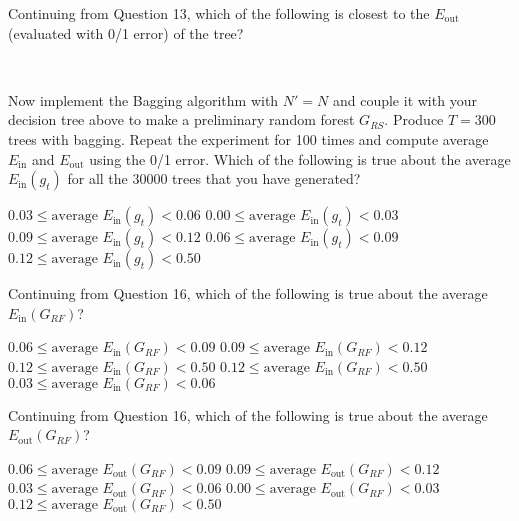 \documentclass[a4paper,10pt]{exam}
\begin{document}
\begin{questions}
	    \question Continuing from Question 13, which of the following is closest to the $E_{\text{out}}$ (evaluated with 0/1 error) of the tree?
	    \begin{choices}
	    \\
	    \end{choices}
	    
	    \question Now implement the Bagging algorithm with $N' = N$ and couple it with your decision tree above to make a preliminary random forest $G_{RS}$. Produce $T=300$ trees with bagging. Repeat the experiment for 100 times and compute average $E_{\text{in}}$ and $E_{\text{out}}$ using the 0/1 error.
	    Which of the following is true about the average $E_{\text{in}}(g_t)$ for all the 30000 trees that you have generated?
	    \begin{choices}
	    	\CorrectChoice $0.03 \leq \mbox{average } E_{\text{in}}(g_t) <0.06$
	    	\choice $0.00 \leq \mbox{average } E_{\text{in}}(g_t) < 0.03$
	    	\choice $0.09 \leq \mbox{average } E_{\text{in}}(g_t) < 0.12$
	    	\choice $0.06 \leq \mbox{average } E_{\text{in}}(g_t) < 0.09$
	    	\choice $0.12 \leq \mbox{average } E_{\text{in}}(g_t) < 0.50$\\
	    \end{choices}
	    
	    \question Continuing from Question 16, which of the following is true about the average $E_{\text{in}}(G_{RF})$?
	    \begin{choices}
	    	\choice $0.06 \leq \mbox{average } E_{\text{in}}(G_{RF}) < 0.09$
	    	\choice $0.09 \leq \mbox{average } E_{\text{in}}(G_{RF}) < 0.12$
	    	\choice $0.12 \leq \mbox{average } E_{\text{in}}(G_{RF}) < 0.50$
	    	\CorrectChoice $0.12 \leq \mbox{average } E_{\text{in}}(G_{RF}) < 0.50$
	    	\choice $0.03 \leq \mbox{average } E_{\text{in}}(G_{RF}) < 0.06$\\
	    \end{choices}
	    
	    \question Continuing from Question 16, which of the following is true about the average $E_{\text{out}}(G_{RF})$?
	    \begin{choices}
	    	\CorrectChoice $0.06 \leq \mbox{average } E_{\text{out}}(G_{RF}) < 0.09$
	    	\choice $0.09 \leq \mbox{average } E_{\text{out}}(G_{RF}) < 0.12$
	    	\choice $0.03 \leq \mbox{average } E_{\text{out}}(G_{RF}) < 0.06$
	    	\choice $0.00 \leq \mbox{average } E_{\text{out}}(G_{RF}) < 0.03$
	    	\choice $0.12 \leq \mbox{average } E_{\text{out}}(G_{RF}) < 0.50$\\
	    \end{choices}
	    

\end{questions}
\end{document}
